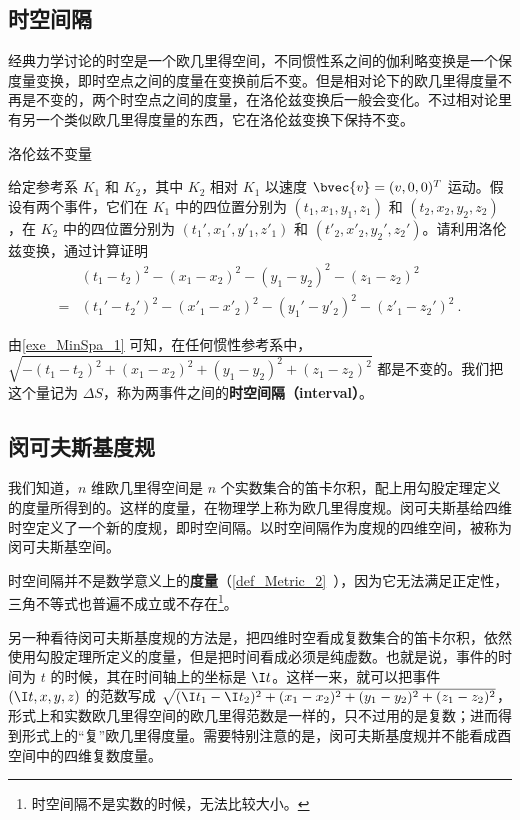 

\subsection{时空间隔}
经典力学讨论的时空是一个欧几里得空间，不同惯性系之间的伽利略变换是一个保度量变换，即时空点之间的度量在变换前后不变。但是相对论下的欧几里得度量不再是不变的，两个时空点之间的度量，在洛伦兹变换后一般会变化。不过相对论里有另一个类似欧几里得度量的东西，它在洛伦兹变换下保持不变。

\begin{exercise}{洛伦兹不变量}\label{exe_MinSpa_1}

给定参考系 $K_1$ 和 $K_2$，其中 $K_2$ 相对 $K_1$ 以速度 $\bvec{v}=(v,0,0)^T$ 运动。假设有两个事件，它们在 $K_1$ 中的四位置分别为 $(t_1, x_1, y_1, z_1)$ 和 $(t_2, x_2, y_2, z_2)$，在 $K_2$ 中的四位置分别为 $(t_1', x_1', y'_1, z'_1)$ 和 $(t'_2, x'_2, y_2', z_2')$。请利用洛伦兹变换，通过计算证明
\begin{equation}
\begin{aligned}
&(t_1-t_2)^2-(x_1-x_2)^2-(y_1-y_2)^2-(z_1-z_2)^2\\=&(t_1'-t_2')^2-(x'_1-x'_2)^2-(y_1'-y'_2)^2-(z'_1-z_2')^2~.
\end{aligned}
\end{equation}
\end{exercise}

由\autoref{exe_MinSpa_1} 可知，在任何惯性参考系中，$\sqrt{-(t_1-t_2)^2+(x_1-x_2)^2+(y_1-y_2)^2+(z_1-z_2)^2}$ 都是不变的。我们把这个量记为 $\Delta S$，称为两事件之间的\textbf{时空间隔（interval）}。

\subsection{闵可夫斯基度规}

我们知道，$n$ 维欧几里得空间是 $n$ 个实数集合的笛卡尔积，配上用勾股定理定义的度量所得到的。这样的度量，在物理学上称为欧几里得度规。闵可夫斯基给四维时空定义了一个新的度规，即时空间隔。以时空间隔作为度规的四维空间，被称为闵可夫斯基空间。

时空间隔并不是数学意义上的\textbf{度量}（\autoref{def_Metric_2}~），因为它无法满足正定性，三角不等式也普遍不成立或不存在\footnote{时空间隔不是实数的时候，无法比较大小。}。

另一种看待闵可夫斯基度规的方法是，把四维时空看成复数集合的笛卡尔积，依然使用勾股定理所定义的度量，但是把时间看成必须是纯虚数。也就是说，事件的时间为 $t$ 的时候，其在时间轴上的坐标是 $\I t$。这样一来，就可以把事件 $(\I t, x, y, z)$ 的范数写成 $\sqrt{(\I t_1-\I t_2)^2+(x_1-x_2)^2+(y_1-y_2)^2+(z_1-z_2)^2}$，形式上和实数欧几里得空间的欧几里得范数是一样的，只不过用的是复数；进而得到形式上的“复”欧几里得度量。需要特别注意的是，闵可夫斯基度规并不能看成酉空间中的四维复数度量。

